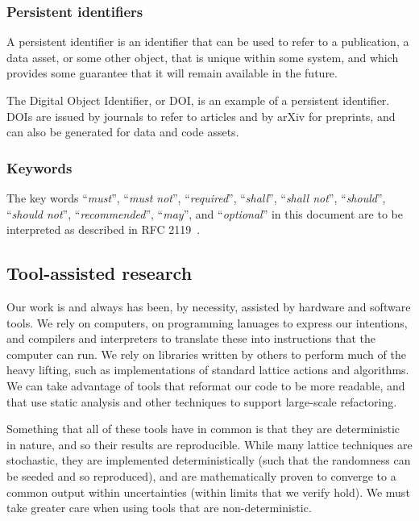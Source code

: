 \documentclass{article}
\newcommand\rfcword[1]{\emph{#1}\xspace}
\newcommand\must{\rfcword{must}}
\newcommand\mustnot{\rfcword{must not}}
\newcommand\required{\rfcword{required}}
\newcommand\shall{\rfcword{shall}}
\newcommand\shallnot{\rfcword{shall not}}
\newcommand\should{\rfcword{should}}
\newcommand\shouldnot{\rfcword{should not}}
\newcommand\recommended{\rfcword{recommended}}
\newcommand\may{\rfcword{may}}
\newcommand\optional{\rfcword{optional}}
\begin{document}
\subsubsection{Persistent identifiers}

A persistent identifier is
an identifier that can be used to refer to
a publication,
a data asset,
or some other object,
that is unique within some system,
and which provides some guarantee that it will remain available in the future.

The Digital Object Identifier,
or DOI,
is an example of a persistent identifier.
DOIs are issued by journals to refer to articles
and by arXiv for preprints,
and can also be generated for data and code assets.


\subsubsection{Keywords}
\label{sec:keywords}

The key words
``\must'',
``\mustnot'',
``\required'',
``\shall'',
``\shallnot'',
``\should'',
``\shouldnot'',
``\recommended'',
``\may'',
and ``\optional''
in this document are to be interpreted as described in RFC 2119~\cite{rfc2119}.

\subsection{Tool-assisted research}
\label{sec:tools}

Our work is and always has been,
by necessity,
assisted by hardware and software tools.
We rely on computers,
on programming lanuages to express our intentions,
and compilers and interpreters to translate these into instructions that the computer can run.
We rely on libraries written by others to perform much of the heavy lifting,
such as implementations of standard lattice actions and algorithms.
We can take advantage of tools that reformat our code to be more readable,
and that use static analysis and other techniques to support large-scale refactoring.

Something that all of these tools have in common is that they are deterministic in nature,
and so their results are reproducible.
While many lattice techniques are stochastic,
they are implemented deterministically
(such that the randomness can be seeded and so reproduced),
and are mathematically proven to converge to a common output within uncertainties
(within limits that we verify hold).
We must take greater care when using tools that are non-deterministic.
\end{document}
